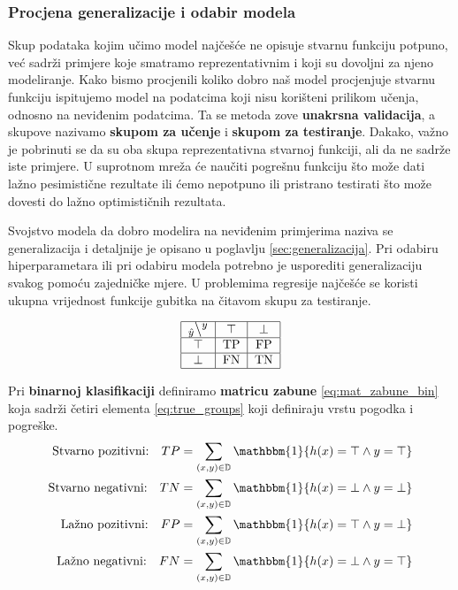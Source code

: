 \documentclass[times, utf8, diplomski]{fer}
\begin{document}
\subsubsection{Procjena generalizacije i odabir modela}
Skup podataka kojim učimo model najčešće ne opisuje stvarnu funkciju potpuno, već sadrži primjere koje smatramo reprezentativnim i koji su dovoljni za njeno modeliranje. Kako bismo procjenili koliko dobro naš model procjenjuje stvarnu funkciju ispitujemo model na podatcima koji nisu korišteni prilikom učenja, odnosno na neviđenim podatcima. Ta se metoda zove \textbf{unakrsna validacija}, a skupove nazivamo \textbf{skupom za učenje} i \textbf{skupom za testiranje}. Dakako, važno je pobrinuti se da su oba skupa reprezentativna stvarnoj funkciji, ali da ne sadrže iste primjere. U suprotnom mreža će naučiti pogrešnu funkciju što može dati lažno pesimistične rezultate ili ćemo nepotpuno ili pristrano testirati što može dovesti do lažno optimističnih rezultata.

Svojstvo modela da dobro modelira na neviđenim primjerima naziva se generalizacija i detaljnije je opisano u poglavlju \ref{sec:generalizacija}. Pri odabiru hiperparametara ili pri odabiru modela potrebno je usporediti generalizaciju svakog pomoću zajedničke mjere. U problemima regresije najčešće se koristi ukupna vrijednost funkcije gubitka na čitavom skupu za testiranje.

\begin{equation}
\label{eq:mat_zabune_bin}
\begin{tabular}{|c|c|c|} \hline
\large{$_{\hat{y}} \setminus ^y$} & $\top$ & $\bot$ \\ \hline
$\top$	& TP & FP \\ \hline
$\bot$	& FN & TN \\ \hline
\end{tabular}
\end{equation}

Pri \textbf{binarnoj klasifikaciji} definiramo \textbf{matricu zabune} \eqref{eq:mat_zabune_bin} koja sadrži četiri elementa \eqref{eq:true_groups} koji definiraju vrstu pogodka i pogreške.
\begin{align}
\label{eq:true_groups}
\begin{split}
\text{Stvarno pozitivni:} \quad TP &= \sum_{(x,y)\in\mathbb{D}} \mathbbm{1} \{h(x) = \top \wedge y = \top \} \\
\text{Stvarno negativni:} \quad TN &= \sum_{(x,y)\in\mathbb{D}} \mathbbm{1} \{h(x) = \bot \wedge y = \bot \} \\
\text{Lažno pozitivni:}   \quad FP &= \sum_{(x,y)\in\mathbb{D}} \mathbbm{1} \{h(x) = \top \wedge y = \bot \} \\
\text{Lažno negativni:}   \quad FN &= \sum_{(x,y)\in\mathbb{D}} \mathbbm{1} \{h(x) = \bot \wedge y = \top \}
\end{split}
\end{align}
\end{document}

